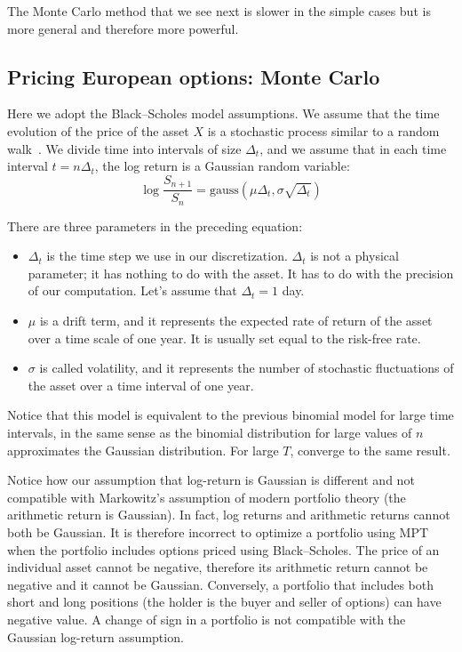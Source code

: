 \documentclass[justified,sixbynine]{tufte-book}
\theoremstyle{plain}%
\theoremstyle{definition}
\theoremstyle{remark}
\begin{document}
\begin{fullwidth}
The Monte Carlo method that we see next is slower in the simple cases but is
more general and therefore more powerful.

\goodbreak\subsection{Pricing European options: Monte Carlo}

Here we adopt the Black--Scholes model assumptions.
We assume that the time evolution of the price of the asset $X$ is
a stochastic process similar to a random walk~\cite{shreve}. We divide time into
intervals of size $\Delta _t$, and we assume that in each time interval $%
t=n\Delta _t$, the log return is a Gaussian random variable:
\begin{equation}
\log \frac{S_{n+1}}{S_n} = \textrm{gauss}(\mu\Delta_t,\sigma\sqrt{\Delta_t}) \label{BS}
\end{equation}

There are three parameters in the preceding equation:

\begin{itemize}
\item  $\Delta _t$ is the time step we use in our discretization. $\Delta _t$
is not a physical parameter; it has nothing to do with the asset. It has to
do with the precision of our computation. Let's assume that $\Delta _t=1$ day.

\item  $\mu $ is a drift term, and it represents the expected rate of return
of the asset over a time scale of one year. It is usually set equal to the risk-free rate.

\item  $\sigma $ is called volatility, and it represents the number of
stochastic fluctuations of the asset over a time interval of one year.
\end{itemize}

Notice that this model is equivalent to the previous binomial model for large time intervals, in the same sense as the binomial distribution for large values of $n$ approximates the Gaussian distribution. For large $T$, converge to the same result.

Notice how our assumption that log-return is Gaussian is different and not compatible with Markowitz's assumption of modern portfolio theory (the arithmetic return is Gaussian). In fact, log returns and arithmetic returns cannot both be Gaussian. It is therefore incorrect to optimize a portfolio using MPT when the portfolio includes options priced using Black--Scholes. The price of an individual asset cannot be negative, therefore its arithmetic return cannot be negative and it cannot be Gaussian. Conversely, a portfolio that includes both short and long positions (the holder is the buyer and seller of options) can have negative value. A change of sign in a portfolio is not compatible with the Gaussian log-return assumption.


\end{fullwidth}
\end{document}
